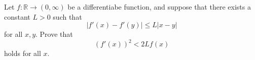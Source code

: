 Let \(f\colon \mathbb R\to(0,\infty)\) be a differentiabe function, and suppose that there exists a constant \(L>0\) such that
\[|f'(x)-f'(y)|\leq L|x-y|\]for all \(x,y\). Prove that
\[(f'(x))^2<2Lf(x)\]holds for all \(x\).